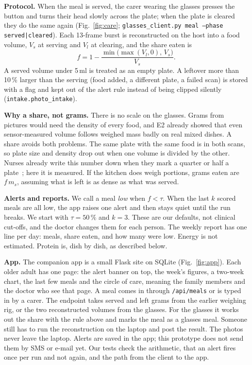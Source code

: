 \textbf{Protocol.} When the meal is served, the carer wearing the glasses
presses the button and turns their head slowly across the plate; when the
plate is cleared they do the same again (Fig.~\ref{fig:care};
\texttt{glasses\_client.py meal --phase served|cleared}). Each 13-frame burst
is reconstructed on the host into a food volume, $V_s$ at serving and $V_l$ at
clearing, and the share eaten is
\begin{equation}\label{eq:intake}
f = 1-\frac{\min\!\big(\max(V_l,0),\,V_s\big)}{V_s}.
\end{equation}
A served volume under 5\,ml is treated as an empty plate. A leftover more than
10\,\% larger than the serving (food added, a different plate, a failed scan)
is stored with a flag and kept out of the alert rule instead of being clipped
silently (\texttt{intake.photo\_intake}).

\textbf{Why a share, not grams.} There is no scale on the glasses. Grams from
pictures would need the density of every food, and E2 already showed that even
sensor-measured volume follows weighed mass badly on real mixed dishes. A share
avoids both problems. The same plate with the same food is in both scans, so
plate size and density drop out when one volume is divided by the other. Nurses
already write this number down when they mark a quarter or half a
plate~\cite{heighington2022visual}; here it is measured. If the kitchen does
weigh portions, grams eaten are $f\,m_s$, assuming what is left is as dense as
what was served.

\textbf{Alerts and reports.} We call a meal \emph{low} when $f<\tau$. When the
last $k$ scored meals are all low, the app raises one alert and then stays quiet
until the run breaks. We start with $\tau=50\,\%$ and $k=3$. These are our
defaults, not clinical cut-offs, and the doctor changes them for each person.
The weekly report has one line per day: meals, share eaten, and how many were
low. Energy is not estimated. Protein is, dish by dish, as described below.

\textbf{App.} The companion app is a small Flask site on SQLite
(Fig.~\ref{fig:app}). Each older adult has one page: the alert banner on top,
the week's figures, a two-week chart, the last few meals and the circle of care,
meaning the family members and the doctor who see that page. A meal comes in
through \texttt{/api/meals} or is typed in by a carer. The endpoint takes served
and left grams from the earlier weighing rig, or the two reconstructed volumes
from the glasses. For the glasses it works out the share with the rule above
and marks the meal as a glasses meal. Someone still has to run the
reconstruction on the laptop and post the result. The photos never leave the
laptop. Alerts are saved in the app; this prototype does not send them by SMS or
e-mail yet. Our tests check the arithmetic, that an alert fires once per run and
not again, and the path from the client to the app.

